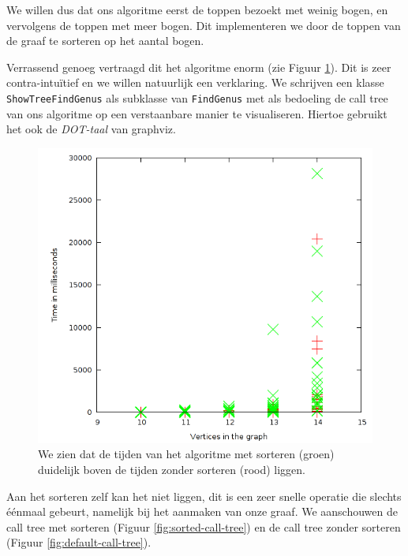 \documentclass{article}
\begin{document}
We willen dus dat ons algoritme eerst de toppen bezoekt met weinig bogen, en
vervolgens de toppen met meer bogen. Dit implementeren we door de toppen van
de graaf te sorteren op het aantal bogen.
\newline

Verrassend genoeg vertraagd dit het algoritme enorm (zie Figuur 
\ref{fig:bounded-vs-sorted}). Dit is zeer
contra-intu\"itief en we willen natuurlijk een verklaring. We schrijven een
klasse \verb#ShowTreeFindGenus# als subklasse van \verb#FindGenus# met als
bedoeling de call tree van ons algoritme op een verstaanbare manier te
visualiseren. Hiertoe gebruikt het ook de \emph{DOT-taal} van graphviz.
\newline

\begin{figure}
\begin{center}
\includegraphics[width=\textwidth]{images/bounded-vs-sorted.png}
\caption{We zien dat de tijden van het algoritme met sorteren (groen) duidelijk
boven de tijden zonder sorteren (rood) liggen.}
\label{fig:bounded-vs-sorted}
\end{center}
\end{figure}

Aan het sorteren zelf kan het niet liggen, dit is een zeer snelle operatie
die slechts \'e\'enmaal gebeurt, namelijk bij het aanmaken van onze graaf.
We aanschouwen de call tree met sorteren (Figuur \ref{fig:sorted-call-tree})
en de call tree zonder sorteren (Figuur \ref{fig:default-call-tree}).
\newline
\end{document}
